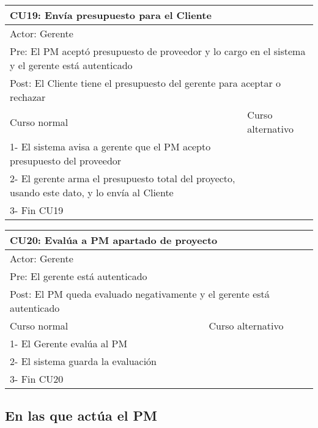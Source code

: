 \begin{table}[H]
  \begin{adjustbox}{max width = \textwidth}
  \begin{tabular}{|l|l|}
    \hline
    \multicolumn{2}{|l|}{CU19: Envía presupuesto para el Cliente} \\\hline
    \multicolumn{2}{|l|}{Actor: Gerente} \\\hline
    \multicolumn{2}{|l|}{Pre: El PM aceptó presupuesto de proveedor y lo cargo en el sistema y el gerente está autenticado} \\\hline
    \multicolumn{2}{|l|}{Post: El Cliente tiene el presupuesto del gerente para aceptar o rechazar} \\\hline
     Curso normal & Curso alternativo\\ \hline
	 1- El sistema avisa a gerente que el PM acepto presupuesto del proveedor & \\ \hline
	 2- El gerente arma el presupuesto total del proyecto, usando este dato, y lo envía al Cliente & \\ \hline
   3- Fin CU19 & \\ \hline
 \end{tabular}
  \end{adjustbox}
\end{table}

\begin{table}[H]
  \begin{adjustbox}{max width = \textwidth}
  \begin{tabular}{|l|l|}
    \hline
    \multicolumn{2}{|l|}{CU20: Evalúa a PM apartado de proyecto} \\\hline
    \multicolumn{2}{|l|}{Actor: Gerente} \\\hline
    \multicolumn{2}{|l|}{Pre: El gerente está autenticado} \\\hline
    \multicolumn{2}{|l|}{Post: El PM queda evaluado negativamente y el gerente está autenticado} \\\hline
     Curso normal & Curso alternativo\\ \hline
  	 1- El Gerente evalúa al PM & \\ \hline
  	 2- El sistema guarda la evaluación &\\ \hline
     3- Fin CU20 & \\ \hline
 \end{tabular}
  \end{adjustbox}
\end{table}

\subsection{En las que actúa el PM}

